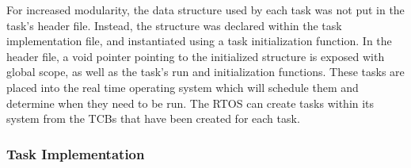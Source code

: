 \documentclass[12pt]{article} %
\begin{document}
    For increased modularity, the data structure used by each task was not put in
    the task's header file. Instead, the structure was declared within the task
    implementation file, and instantiated using a task initialization function. In
    the header file, a void pointer pointing to the initialized structure is
    exposed with global scope, as well as the task's run and initialization functions.
These tasks are placed into the real time operating system which will schedule them and determine when they need to be run.
The RTOS can create tasks within its system from the TCBs that have been created for each task.

    \subsubsection{Task Implementation}

\end{document}
